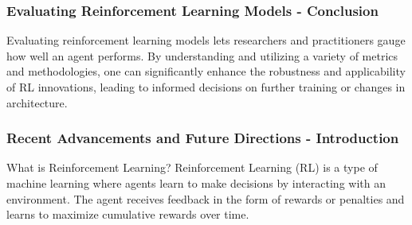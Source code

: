 \documentclass[aspectratio=169]{beamer}
\begin{document}
\begin{frame}[fragile]
    \frametitle{Evaluating Reinforcement Learning Models - Conclusion}
    Evaluating reinforcement learning models lets researchers and practitioners gauge how well an agent performs. 
    By understanding and utilizing a variety of metrics and methodologies, one can significantly enhance the robustness and applicability of RL innovations, leading to informed decisions on further training or changes in architecture.
\end{frame}

\begin{frame}[fragile]
    \frametitle{Recent Advancements and Future Directions - Introduction}
    \begin{block}{What is Reinforcement Learning?}
        Reinforcement Learning (RL) is a type of machine learning where agents learn to make decisions by interacting with an environment. The agent receives feedback in the form of rewards or penalties and learns to maximize cumulative rewards over time.
    \end{block}
\end{frame}
\end{document}
